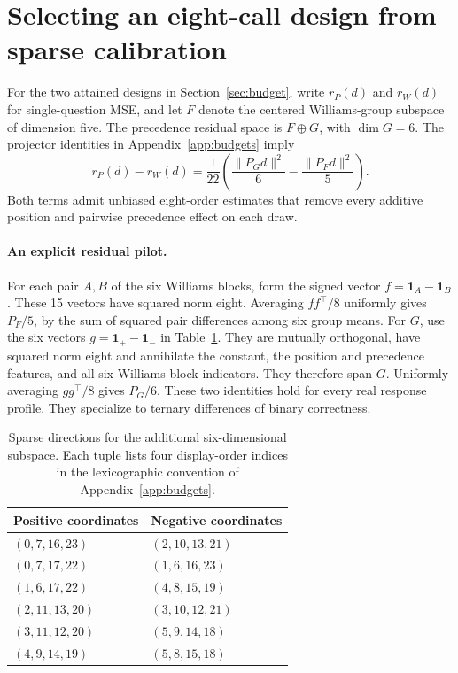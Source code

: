\section{Selecting an eight-call design from sparse calibration}
\label{app:sparse-pilot}
For the two attained designs in Section~\ref{sec:budget}, write $r_P(d)$
and $r_W(d)$ for single-question MSE, and let $F$ denote the centered
Williams-group subspace of dimension five. The precedence residual
space is $F\oplus G$, with $\dim G=6$. The projector identities in
Appendix~\ref{app:budgets} imply
\begin{equation}
 r_P(d)-r_W(d)=\frac{1}{22}
 \left(\frac{\|P_Gd\|^2}{6}-\frac{\|P_Fd\|^2}{5}\right).
 \label{eq:pilot-difference}
\end{equation}
Both terms admit unbiased eight-order estimates that remove every
additive position and pairwise precedence effect on each draw.

\paragraph{An explicit residual pilot.}
For each pair $A,B$ of the six Williams blocks, form the signed vector
$f=\mathbf1_A-\mathbf1_B$. These 15 vectors have squared norm eight.
Averaging $ff^\top/8$ uniformly gives $P_F/5$, by the sum of squared
pair differences among six group means. For $G$, use the six vectors
$g=\mathbf1_{+}-\mathbf1_{-}$ in Table~\ref{tab:pilot-directions}.
They are mutually orthogonal, have squared norm eight and annihilate
the constant, the position and precedence features, and all six
Williams-block indicators. They therefore span $G$. Uniformly
averaging $gg^\top/8$ gives $P_G/6$. These two identities hold for
every real response profile. They specialize to ternary differences
of binary correctness.

\begin{table}[h]
\centering
\caption{Sparse directions for the additional six-dimensional subspace.
Each tuple lists four display-order indices in the lexicographic convention of Appendix~\ref{app:budgets}.}
\label{tab:pilot-directions}
\begin{tabular}{ll}
\toprule
Positive coordinates & Negative coordinates \\
\midrule
$(0,7,16,23)$ & $(2,10,13,21)$ \\
$(0,7,17,22)$ & $(1,6,16,23)$ \\
$(1,6,17,22)$ & $(4,8,15,19)$ \\
$(2,11,13,20)$ & $(3,10,12,21)$ \\
$(3,11,12,20)$ & $(5,9,14,18)$ \\
$(4,9,14,19)$ & $(5,8,15,18)$ \\
\bottomrule
\end{tabular}
\end{table}

